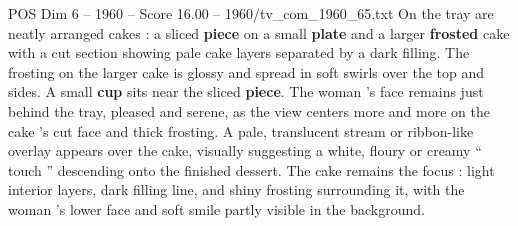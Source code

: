 \begin{textsample}{POS Dim 6 – 1960 – Score 16.00 – 1960/tv\_com\_1960\_65.txt}
On the tray are neatly arranged cakes : a sliced \textbf{piece} on a small \textbf{plate} and a larger \textbf{frosted} cake with a cut section showing pale cake layers separated by a dark filling.
The frosting on the larger cake is glossy and spread in soft swirls over the top and sides.
A small \textbf{cup} sits near the sliced \textbf{piece}.
The woman ’s face remains just behind the tray, pleased and serene, as the view centers more and more on the cake ’s cut face and thick frosting.
A pale, translucent stream or ribbon-like overlay appears over the cake, visually suggesting a white, floury or creamy “ touch ” descending onto the finished dessert.
The cake remains the focus : light interior layers, dark filling line, and shiny frosting surrounding it, with the woman ’s lower face and soft smile partly visible in the background.

\end{textsample}
